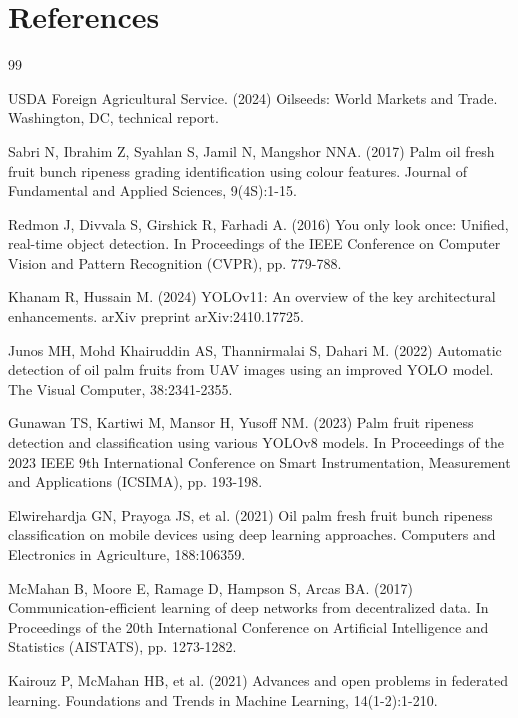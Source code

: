 \documentclass[twocolumn,a4paper,10pt]{article}
\begin{document}
\section*{References}
\begin{thebibliography}{99}
\small

 USDA Foreign Agricultural Service. (2024) Oilseeds: World
Markets and Trade. Washington, DC, technical report.

 Sabri N, Ibrahim Z, Syahlan S, Jamil N, Mangshor NNA.
(2017) Palm oil fresh fruit bunch ripeness grading identification using colour
features. Journal of Fundamental and Applied Sciences, 9(4S):1-15.

 Redmon J, Divvala S, Girshick R, Farhadi A. (2016) You
only look once: Unified, real-time object detection. In Proceedings of the IEEE
Conference on Computer Vision and Pattern Recognition (CVPR), pp. 779-788.

 Khanam R, Hussain M. (2024) YOLOv11: An overview of the key
architectural enhancements. arXiv preprint arXiv:2410.17725.

 Junos MH, Mohd Khairuddin AS, Thannirmalai S, Dahari M.
(2022) Automatic detection of oil palm fruits from UAV images using an improved
YOLO model. The Visual Computer, 38:2341-2355.

 Gunawan TS, Kartiwi M, Mansor H, Yusoff NM. (2023) Palm
fruit ripeness detection and classification using various YOLOv8 models. In
Proceedings of the 2023 IEEE 9th International Conference on Smart
Instrumentation, Measurement and Applications (ICSIMA), pp. 193-198.

 Elwirehardja GN, Prayoga JS, et al. (2021) Oil palm
fresh fruit bunch ripeness classification on mobile devices using deep learning
approaches. Computers and Electronics in Agriculture, 188:106359.

 McMahan B, Moore E, Ramage D, Hampson S, Arcas BA. (2017)
Communication-efficient learning of deep networks from decentralized data. In
Proceedings of the 20th International Conference on Artificial Intelligence and
Statistics (AISTATS), pp. 1273-1282.

 Kairouz P, McMahan HB, et al. (2021) Advances and open
problems in federated learning. Foundations and Trends in Machine Learning,
14(1-2):1-210.


\end{thebibliography}
\end{document}
